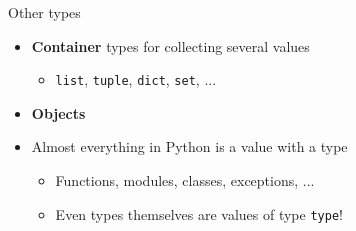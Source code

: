 \begin{frame}{Other types}
	\begin{itemize}
		\pause\item \textbf{Container} types for collecting several values
			\begin{itemize}
				\pause\item \lstinline{list}, \lstinline{tuple}, \lstinline{dict}, \lstinline{set}, ...
			\end{itemize}
		\pause\item \textbf{Objects}
		\pause\item Almost everything in Python is a value with a type
			\begin{itemize}
				\pause\item Functions, modules, classes, exceptions, ...
				\pause\item Even types themselves are values of type \lstinline{type}!
			\end{itemize}
	\end{itemize}
\end{frame}

